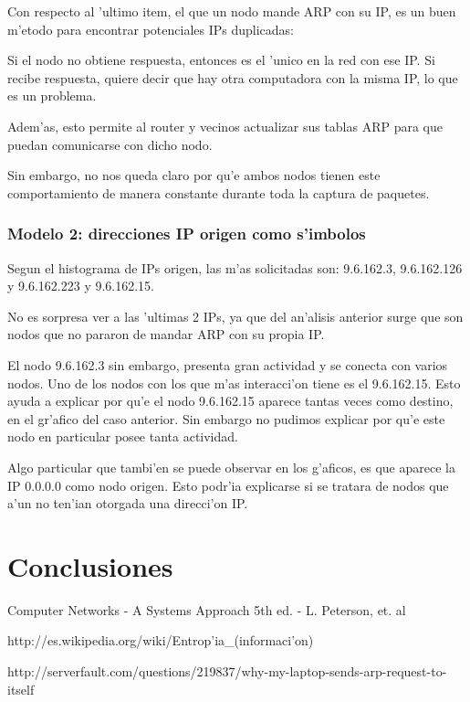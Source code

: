 \documentclass[a4paper,10pt]{article}
\begin{document}
Con respecto al 'ultimo item, el que un nodo mande ARP con su IP, es un buen m'etodo para encontrar potenciales IPs duplicadas:

Si el nodo no obtiene respuesta, entonces es el 'unico en la red con ese IP. Si recibe respuesta, quiere decir que hay otra computadora con la misma IP, lo que es un problema.

Adem'as, esto permite al router y vecinos actualizar sus tablas ARP para que puedan comunicarse con dicho nodo. 

Sin embargo, no nos queda claro por qu'e ambos nodos tienen este comportamiento de manera constante durante toda la captura de paquetes.

\subsubsection{Modelo 2: direcciones IP origen como s'imbolos}

Segun el histograma de IPs origen, las m'as solicitadas son: 9.6.162.3, 9.6.162.126 y 9.6.162.223 y 9.6.162.15.

No es sorpresa ver a las 'ultimas 2 IPs, ya que del an'alisis anterior surge que son nodos que no pararon de mandar ARP con su propia IP.

El nodo 9.6.162.3 sin embargo, presenta gran actividad y se conecta con varios nodos. Uno de los nodos con los que m'as interacci'on tiene es el 9.6.162.15. Esto ayuda a explicar por qu'e el nodo 9.6.162.15 aparece tantas veces como destino, en el gr'afico del caso anterior. Sin embargo no pudimos explicar por qu'e este nodo en particular posee tanta actividad.

Algo particular que tambi'en se puede observar en los g'aficos, es que aparece la IP 0.0.0.0 como nodo origen. Esto podr'ia explicarse si se tratara de nodos que a'un no ten'ian otorgada una direcci'on IP.

\section{Conclusiones}
\label{conclusion1:}

\begin{thebibliography}{99}
	\item Computer Networks - A Systems Approach 5th ed. - L. Peterson, et. al
	\item http://es.wikipedia.org/wiki/Entrop'ia\_(informaci'on)
	\item http://serverfault.com/questions/219837/why-my-laptop-sends-arp-request-to-itself 
\end{thebibliography}
\end{document}

